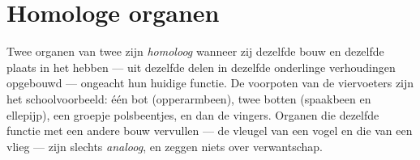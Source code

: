 \section{Homologe organen}

\begin{definition}[Homologie]\label{def:g10:common-ancestry:homology}
Twee organen van twee  zijn \emph{homoloog}
wanneer zij dezelfde bouw en dezelfde plaats in het  hebben ---
uit dezelfde delen in dezelfde onderlinge verhoudingen opgebouwd ---
ongeacht hun huidige functie. De voorpoten van de viervoeters zijn het
schoolvoorbeeld: één bot (opperarmbeen), twee botten (spaakbeen en
ellepijp), een groepje polsbeentjes, en dan de vingers. Organen die
dezelfde functie met een andere bouw vervullen --- de vleugel van een
vogel en die van een vlieg --- zijn slechts \emph{analoog}, en zeggen
niets over verwantschap.
\end{definition}

